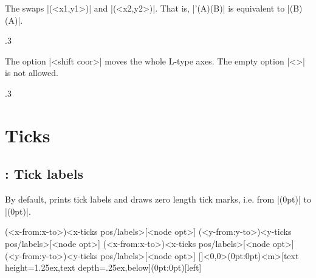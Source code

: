 The   swaps |(<x1,y1>)| and |(<x2,y2>)|.
That is, |\tzaxesL'(A)(B)| is equivalent to |\tzaxesL(B)(A)|.

\begin{tzcode}{.3}
\end{tzcode}

The option |<shift coor>| moves the whole L-type axes.
The empty option |<>| is not allowed.

\begin{tzcode}{.3}
\end{tzcode}



\chapter{Ticks}
\label{c:ticks}


\section{\protect\cmd{\tzticks}: Tick labels}
\label{s:tzticks}

By default, \icmd{\tzticks} prints tick labels and draws zero length tick marks, i.e. from |(0pt)| to |(0pt)|.

\begin{tzdef}{}
\tzticks(<x-from:x-to>){<x-ticks pos/labels>}[<node opt>]
        (<y-from:y-to>){<y-ticks pos/labels>}[<node opt>]
        (<x-from:x-to>){<x-ticks pos/labels>}[<node opt>]
        (<y-from:y-to>){<y-ticks pos/labels>}[<node opt>]
  []<0,0>(0pt:0pt){<m>}[text height=1.25ex,text depth=.25ex,below](0pt:0pt){}[left]
\end{tzdef}

